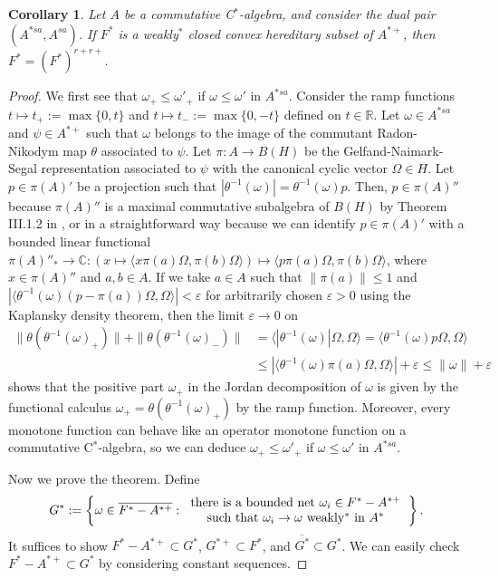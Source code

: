 \documentclass[noamsfonts,a4paper,10pt]{amsart}
\theoremstyle{plain}
\newtheorem{corollary}[theorem]{Corollary}
\theoremstyle{definition}
\begin{document}
\begin{corollary}
Let $A$ be a commutative C$^*$-algebra, and consider the dual pair $(A^{*sa},A^{sa})$.
If $F^*$ is a weakly$^*$ closed convex hereditary subset of $A^{*+}$, then $F^*=(F^*)^{r+r+}$.
\end{corollary}
\begin{proof}
We first see that $\omega_+\le\omega'_+$ if $\omega\le\omega'$ in $A^{*sa}$.
Consider the ramp functions $t\mapsto t_+:=\max\{0,t\}$ and $t\mapsto t_-:=\max\{0,-t\}$ defined on $t\in\mathbb{R}$.
Let $\omega\in A^{*sa}$ and $\psi\in A^{*+}$ such that $\omega$ belongs to the image of the commutant Radon-Nikodym map $\theta$ associated to $\psi$.
Let $\pi:A\to B(H)$ be the Gelfand-Naimark-Segal representation associated to $\psi$ with the canonical cyclic vector $\Omega\in H$.
Let $p\in\pi(A)'$ be a projection such that $|\theta^{-1}(\omega)|=\theta^{-1}(\omega)p$.
Then, $p\in\pi(A)''$ because $\pi(A)''$ is a maximal commutative subalgebra of $B(H)$ by Theorem III.1.2 in \cite{MR1873025}, or in a straightforward way because we can identify $p\in\pi(A)'$ with a bounded linear functional $\pi(A)''_*\to\mathbb{C}:(x\mapsto\langle x\pi(a)\Omega,\pi(b)\Omega\rangle)\mapsto\langle p\pi(a)\Omega,\pi(b)\Omega\rangle$, where $x\in\pi(A)''$ and $a,b\in A$.
If we take $a\in A$ such that $\|\pi(a)\|\le1$ and $|\langle\theta^{-1}(\omega)(p-\pi(a))\Omega,\Omega\rangle|<\varepsilon$ for arbitrarily chosen $\varepsilon>0$ using the Kaplansky density theorem, then the limit $\varepsilon\to0$ on
\begin{align*}
\|\theta(\theta^{-1}(\omega)_+)\|+\|\theta(\theta^{-1}(\omega)_-)\|
&=\langle|\theta^{-1}(\omega)|\Omega,\Omega\rangle
=\langle\theta^{-1}(\omega)p\Omega,\Omega\rangle\\
&\le|\langle\theta^{-1}(\omega)\pi(a)\Omega,\Omega\rangle|+\varepsilon\le\|\omega\|+\varepsilon
\end{align*}
shows that the positive part $\omega_+$ in the Jordan decomposition of $\omega$ is given by the functional calculus $\omega_+=\theta(\theta^{-1}(\omega)_+)$ by the ramp function.
Moreover, every monotone function can behave like an operator monotone function on a commutative C$^*$-algebra, so we can deduce $\omega_+\le\omega'_+$ if $\omega\le\omega'$ in $A^{*sa}$.

Now we prove the theorem.
Define
\[G^*:=\left\{\omega\in\overline{F^*-A^{*+}}:\begin{tabular}{c}there is a bounded net $\omega_i\in F^*-A^{*+}$\\such that $\omega_i\to\omega$ weakly$^*$ in $A^*$\end{tabular}\right\}.\]
It suffices to show $F^*-A^{*+}\subset G^*$, $G^{*+}\subset F^*$, and $\overline{G^*}\subset G^*$.
We can easily check $F^*-A^{*+}\subset G^*$ by considering constant sequences.


\end{proof}
\end{document}
